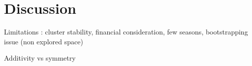 \section{Discussion}
\label{sec:discuss}


Limitations : cluster stability, financial consideration, few seasons, bootstrapping issue (non explored space) 

Additivity vs symmetry


